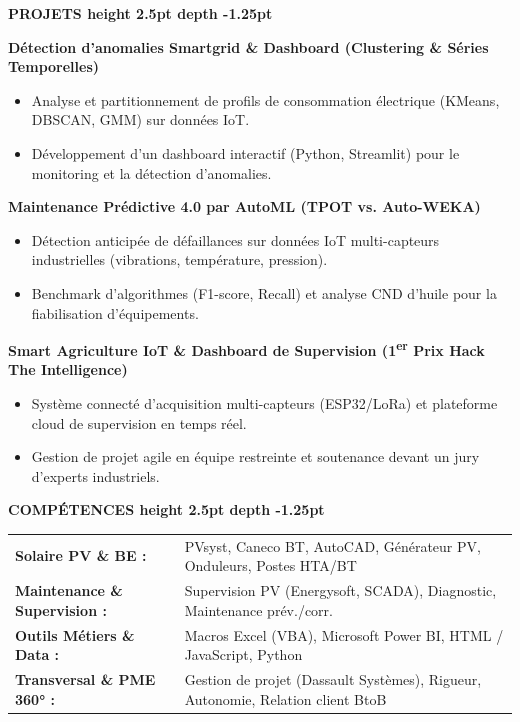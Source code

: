 \documentclass[10pt,a4paper]{altacv}
\renewcommand{\cvsection}[2][]{%
  \vspace{3pt}%
  {\color{heading}\Large\bfseries #2 \hspace{0.2em}\leaders\vrule height 2.5pt depth -1.25pt\hfill\mbox{}}\par\vspace{2.5pt}
}
\begin{document}
\cvsection{PROJETS}
{\normalsize\bfseries\color{accent} Détection d’anomalies Smartgrid \& Dashboard (Clustering \& Séries Temporelles)}\par\vspace{1.5pt}
\begin{itemize}[leftmargin=*, label=\textbullet, nosep, itemsep=1.5pt]
  \item Analyse et partitionnement de profils de consommation électrique (KMeans, DBSCAN, GMM) sur données IoT.
  \item Développement d’un dashboard interactif (Python, Streamlit) pour le monitoring et la détection d’anomalies.
\end{itemize}
\vspace{1.5pt}
{\normalsize\bfseries\color{accent} Maintenance Prédictive 4.0 par AutoML (TPOT vs. Auto-WEKA)}\par\vspace{1.5pt}
\begin{itemize}[leftmargin=*, label=\textbullet, nosep, itemsep=1.5pt]
  \item Détection anticipée de défaillances sur données IoT multi-capteurs industrielles (vibrations, température, pression).
  \item Benchmark d’algorithmes (F1-score, Recall) et analyse CND d’huile pour la fiabilisation d’équipements.
\end{itemize}
\vspace{1.5pt}
{\normalsize\bfseries\color{accent} Smart Agriculture IoT \& Dashboard de Supervision (1\textsuperscript{er} Prix Hack The Intelligence)}\par\vspace{1.5pt}
\begin{itemize}[leftmargin=*, label=\textbullet, nosep, itemsep=1.5pt]
  \item Système connecté d’acquisition multi-capteurs (ESP32/LoRa) et plateforme cloud de supervision en temps réel.
  \item Gestion de projet agile en équipe restreinte et soutenance devant un jury d'experts industriels.
\end{itemize}

\cvsection{COMPÉTENCES}
\begin{tabular}{@{}ll@{}}
\textbf{Solaire PV \& BE :} & PVsyst, Caneco BT, AutoCAD, Générateur PV, Onduleurs, Postes HTA/BT \\[1.5pt]
\textbf{Maintenance \& Supervision :} & Supervision PV (Energysoft, SCADA), Diagnostic, Maintenance prév./corr. \\[1.5pt]
\textbf{Outils Métiers \& Data :} & Macros Excel (VBA), Microsoft Power BI, HTML / JavaScript, Python \\[1.5pt]
\textbf{Transversal \& PME 360° :} & Gestion de projet (Dassault Systèmes), Rigueur, Autonomie, Relation client BtoB
\end{tabular}
\end{document}
